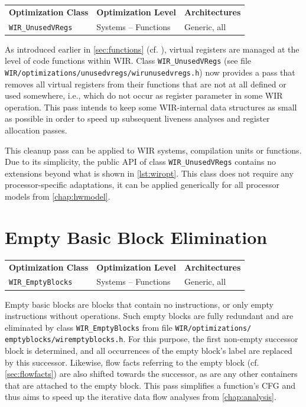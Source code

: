 \begin{tabular}{|l|l|l|}
  \hline
  \textbf{Optimization Class} & \textbf{Optimization Level} & \textbf{Architectures} \\
  \hhline{|=|=|=|}
  \texttt{WIR\_UnusedVRegs} & Systems -- Functions & Generic, all \\
  \hline
\end{tabular}

As introduced earlier in \cref{sec:functions} (cf. ), virtual registers are managed at the level of code functions within \gls{WIR}.
Class \texttt{WIR\_UnusedVRegs} (see file \texttt{WIR/optimizations/unusedvregs/wirunusedvregs.h}) now provides a pass that removes all virtual registers from their functions that are not at all defined or used somewhere, i.e., which do not occur as register parameter in some \gls{WIR} operation.
This pass intends to keep some \gls{WIR}-internal data structures as small as possible in order to speed up subsequent liveness analyses and register allocation passes.

This cleanup pass can be applied to \gls{WIR} systems, compilation units or functions.
Due to its simplicity, the public \gls{API} of class \texttt{WIR\_UnusedVRegs} contains no extensions beyond what is shown in \cref{lst:wiropt}.
This class does not require any processor-specific adaptations, it can be applied generically for all processor models from \cref{chap:hwmodel}.


\section{Empty Basic Block Elimination}
\label{sec:optemptybbs}

\begin{tabular}{|l|l|l|}
  \hline
  \textbf{Optimization Class} & \textbf{Optimization Level} & \textbf{Architectures} \\
  \hhline{|=|=|=|}
  \texttt{WIR\_EmptyBlocks} & Systems -- Functions & Generic, all \\
  \hline
\end{tabular}

Empty basic blocks are blocks that contain no instructions, or only empty instructions without operations.
Such empty blocks are fully redundant and are eliminated by class \texttt{WIR\_EmptyBlocks} from file \texttt{WIR/optimizations/ emptyblocks/wiremptyblocks.h}.
For this purpose, the first non-empty successor block is determined, and all occurrences of the empty block's label are replaced by this successor.
Likewise, flow facts referring to the empty block (cf. \cref{sec:flowfacts}) are also shifted towards the successor, as are any other containers that are attached to the empty block.
This pass simplifies a function's \gls{CFG} and thus aims to speed up the iterative data flow analyses from \cref{chap:analysis}.

